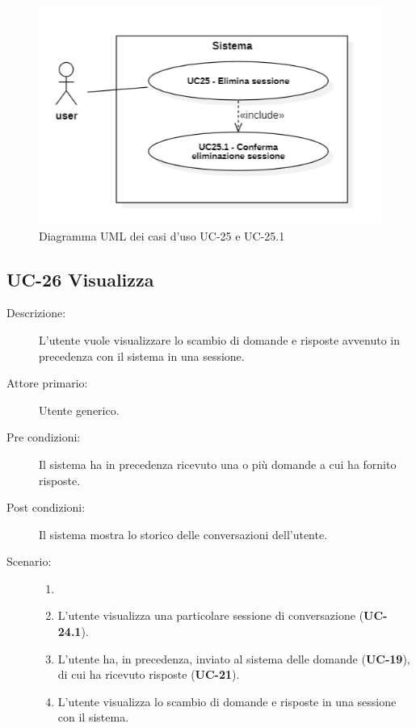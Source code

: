 \begin{figure}[H]
    \centering
    \includegraphics[width=0.9\linewidth]{UC25.png} 
    \caption{Diagramma UML dei casi d'uso UC-25 e UC-25.1}
\end{figure}

\subsection{UC-26 Visualizza }
\begin{description}
    \item[Descrizione:] L'utente vuole visualizzare lo scambio di domande e risposte avvenuto in precedenza con il sistema in una sessione.
    \item[Attore primario:] Utente generico.
    \item[Pre condizioni:] Il sistema ha in precedenza ricevuto una o più domande a cui ha fornito risposte.
    \item[Post condizioni:] Il sistema mostra lo storico delle conversazioni dell'utente.
    \item[Scenario:]
    \begin{enumerate}
        \item[]
        \item L'utente visualizza una particolare sessione di conversazione (\textbf{UC-24.1}).
        \item L'utente ha, in precedenza, inviato al sistema delle domande (\textbf{UC-19}), di cui ha ricevuto risposte (\textbf{UC-21}).
        \item L'utente visualizza lo scambio di domande e risposte in una sessione con il sistema.
    \end{enumerate}
    
\end{description} 

